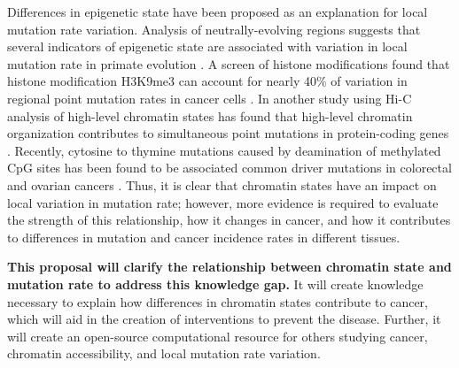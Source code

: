 Differences in epigenetic state have been proposed as an explanation for local mutation rate variation.
Analysis of neutrally-evolving regions suggests that several indicators of epigenetic state are associated with variation in local mutation rate in primate evolution \parencite{makova_effects_2015}.
A screen of histone modifications found that histone modification H3K9me3 can account for nearly 40\% of variation in regional point mutation rates in cancer cells \parencite{schuster-bockler_chromatin_2012}.
In another study using Hi-C analysis of high-level chromatin states has found that high-level chromatin organization contributes to simultaneous point mutations in protein-coding genes \parencite{shi_chromatin_2016}.
Recently, cytosine to thymine mutations caused by deamination of methylated CpG sites has been found to be associated common driver mutations in colorectal and ovarian cancers \parencite{gold_somatic_2017}.
Thus, it is clear that chromatin states have an impact on local variation in mutation rate; however, more evidence is required to evaluate the strength of this relationship, how it changes in cancer, and how it contributes to differences in mutation and cancer incidence rates in different tissues.

\textbf{This proposal will clarify the relationship between chromatin state and mutation rate to address this knowledge gap.}
It will create knowledge necessary to explain how differences in chromatin states contribute to cancer, which will aid in the creation of interventions to prevent the disease. Further, it will create an open-source computational resource for others studying cancer, chromatin accessibility, and local mutation rate variation.



